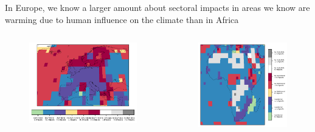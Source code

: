 \documentclass[9pt]{beamer}
\begin{document}
\begin{frame}{In Europe, we know a larger amount about sectoral impacts in areas we know are warming due to human influence on the climate than in Africa}

\begin{columns}
	\begin{column}{0.6\linewidth}
		\begin{figure}
			\includegraphics[width=\linewidth]{../plots/maps/gridcells_da_studies_temp_2_5_Europe.png}
		\end{figure}
	\end{column}
	\begin{column}{0.4\linewidth}
		\begin{figure}
			\includegraphics[width=\linewidth]{../plots/maps/gridcells_da_studies_temp_2_5_Africa.png}
		\end{figure}
	\end{column}
\end{columns}


\end{frame}
\end{document}
